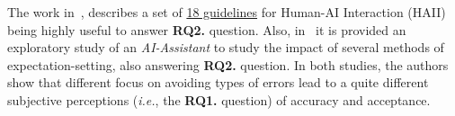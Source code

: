 The work in~\cite{10.1145/3290605.3300233}, describes a set of \underline{18 guidelines} for Human-AI Interaction (HAII) being highly useful to answer {\bf RQ2.} question.
Also, in~\cite{Kocielnik:2019:YAI:3290605.3300641} it is provided  an exploratory study of an {\it AI-Assistant} to study the impact of several methods of expectation-setting, also answering {\bf RQ2.} question.
In both studies, the authors show that different focus on avoiding types of errors lead to a quite different subjective perceptions ({\it i.e.}, the {\bf RQ1.} question) of accuracy and acceptance.

\break